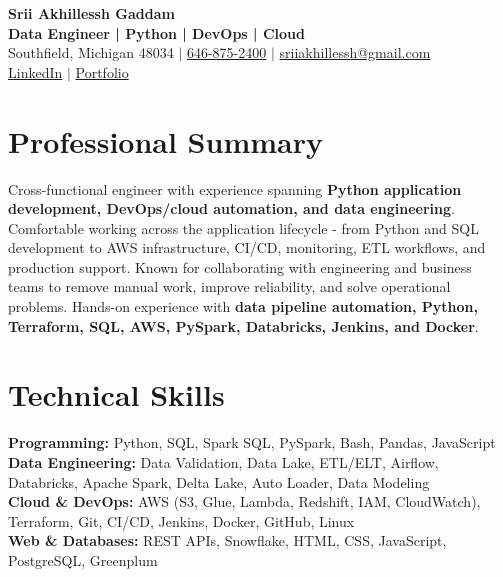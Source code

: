 \documentclass[letterpaper,10pt]{article}
\begin{document}
\fontsize{9.35pt}{10.45pt}\selectfont

\begin{center}
    {\LARGE \textbf{Srii Akhillessh Gaddam}} \\[-1pt]
    \textbf{Data Engineer | Python | DevOps | Cloud} \\[2pt]
    Southfield, Michigan 48034 $|$
    \href{tel:6468752400}{646-875-2400} $|$
    \href{mailto:sriiakhillessh@gmail.com}{sriiakhillessh@gmail.com} \\[1pt]
    \href{https://www.linkedin.com/in/srii-akhiilessh-gaddam-b48668191/}{LinkedIn} $|$
    \href{https://sriiakhillesshg.github.io/portfolio/}{Portfolio}
\end{center}
\vspace{-8pt}

\section{Professional Summary}
\small{Cross-functional engineer with experience spanning \textbf{Python application development, DevOps/cloud automation, and data engineering}. Comfortable working across the application lifecycle - from Python and SQL development to AWS infrastructure, CI/CD, monitoring, ETL workflows, and production support. Known for collaborating with engineering and business teams to remove manual work, improve reliability, and solve operational problems. Hands-on experience with \textbf{data pipeline automation, Python, Terraform, SQL, AWS, PySpark, Databricks, Jenkins, and Docker}.}

\section{Technical Skills}
\small{
\textbf{Programming:} Python, SQL, Spark SQL, PySpark, Bash, Pandas, JavaScript \\
\textbf{Data Engineering:} Data Validation, Data Lake, ETL/ELT, Airflow, Databricks, Apache Spark, Delta Lake, Auto Loader, Data Modeling \\
\textbf{Cloud \& DevOps:} AWS (S3, Glue, Lambda, Redshift, IAM, CloudWatch), Terraform, Git, CI/CD, Jenkins, Docker, GitHub, Linux \\
\textbf{Web \& Databases:} REST APIs, Snowflake, HTML, CSS, JavaScript, PostgreSQL, Greenplum
}
\end{document}
